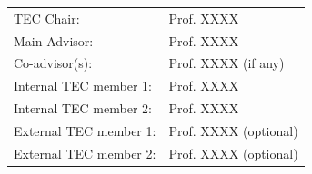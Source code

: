 \documentclass[
11pt, %
oneside, %
english, %
singlespacing, %
parskip, %
headsepline, %
]{MastersDoctoralThesis} %
\theoremstyle{definition}
\newcommand{\0}{{0_\TheCategoryOfSets}}
\newcommand{\1}{{1_\TheCategoryOfSets}}
\begin{document}

\begin{tec}
\addchaptertocentry{\tecname}
\begin{tabular}{ll}
	TEC Chair: & Prof. XXXX \\
	Main Advisor: & Prof. XXXX \\
	Co-advisor(s): & Prof. XXXX (if any) \\
	Internal TEC member 1: & Prof. XXXX \\
	Internal TEC member 2: & Prof. XXXX \\
	External TEC member 1: & Prof. XXXX (optional) \\
	External TEC member 2: & Prof. XXXX (optional) \\
\end{tabular}
\end{tec}
\vfill\eject

 
\end{document}
